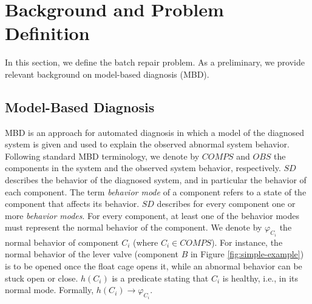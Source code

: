 \documentclass[review]{elsarticle}
\newcommand\hilla[1]{\textcolor{blue}{hilla: #1}}
\newcommand\roni[1]{\textcolor{green}{roni: #1}}
\newcommand{\COMPS}{\textit{COMPS}}
\newcommand{\SD}{\textit{SD}}
\newcommand{\OBS}{\textit{OBS}}
\begin{document}
\section{Background and Problem Definition}
In this section, we define the batch repair problem. As a preliminary, we provide relevant background on model-based diagnosis (MBD). %

\subsection{Model-Based Diagnosis}
MBD is an approach for automated diagnosis in which a model of the diagnosed system is given and used to explain the observed abnormal system behavior. Following standard MBD terminology, we denote by $\COMPS$ and $\OBS$ the components in the system and the observed system behavior, respectively. $\SD$ describes the behavior of the diagnosed system, and in particular the behavior of each component. The term {\em behavior mode} of a component refers to a state of the component that affects its behavior. $\SD$ describes for every component one or more \emph{behavior modes}. For every component, at least one of the behavior modes must represent the normal behavior of the component. 
We denote by $\varphi_{C_i}$ the normal behavior of component $C_i$ (where $C_i\in\COMPS$). For instance, the normal behavior of the lever valve (component $B$ in Figure \ref{fig:simple-example}) is to be opened once the float cage opens it, while an abnormal behavior can be stuck open or close. $h(C_i)$ is a predicate stating that $C_i$ is healthy, i.e., in its normal mode. Formally, $h(C_i) \rightarrow \varphi_{C_i}$. 

\end{document}

